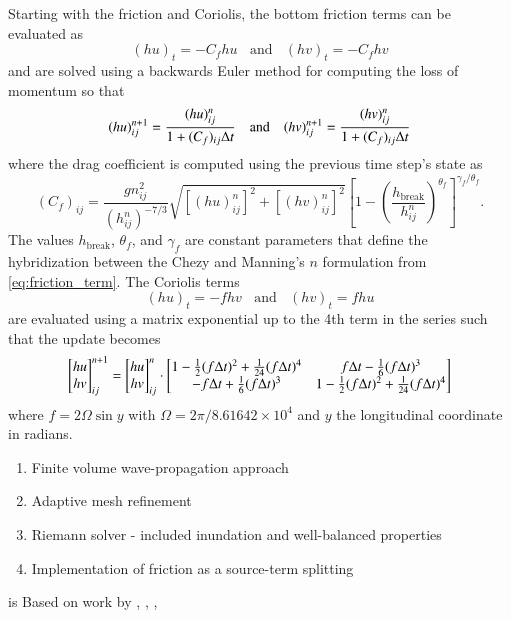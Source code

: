 Starting with the friction and Coriolis, the bottom friction terms can be evaluated as
\[
    (hu)_t = -C_f hu ~~~~\text{and}~~~~ (hv)_t = -C_f hv
\]
and are solved using a backwards Euler method for computing the loss of momentum so that
\[
    (hu)^{n+1}_{ij} = \frac{(hu)^n_{ij}}{1 + (C_f)_{ij} \Delta t} ~~~~\text{and}~~~~
    (hv)^{n+1}_{ij} = \frac{(hv)^n_{ij}}{1 + (C_f)_{ij} \Delta t}
\]
where the drag coefficient is computed using the previous time step's state as
\[
    (C_f)_{ij} = \frac{gn_{ij}^2}{(h^n_{ij})^{-7/3}} \sqrt{[(hu)^n_{ij}]^2 + [(hv)^n_{ij}]^2} \left[1-\left(\frac{h_{\text{break}}}{h^n_{ij}}\right)^{\theta_f} \right]^{\gamma_f / \theta_f}.
\]
The values $h_{\text{break}}$, $\theta_f$, and $\gamma_f$ are constant parameters that define the hybridization between the Chezy and Manning's $n$ formulation from \eqref{eq:friction_term}.  The Coriolis terms
\[
    (hu)_t = -f hv ~~~~\text{and}~~~~ (hv)_t = f hu
\]
are evaluated using a matrix exponential up to the 4th term in the series such that the update becomes
\[
    \begin{bmatrix}
        hu \\ hv     
    \end{bmatrix}^{n+1}_{ij} = 
    \begin{bmatrix}
        hu \\ hv     
    \end{bmatrix}^{n}_{ij} \cdot 
    \begin{bmatrix}
        1 - \frac{1}{2} (f \Delta t)^2 + \frac{1}{24} (f \Delta t)^4 & f \Delta t - \frac{1}{6} (f \Delta t)^3 \\
        - f \Delta t + \frac{1}{6} (f \Delta t)^3 & 1 - \frac{1}{2} (f \Delta t)^2 + \frac{1}{24} (f \Delta t)^4
    \end{bmatrix}
\]
where $f = 2 \Omega \sin y$ with $\Omega = 2 \pi / 8.61642\times10^4$ and $y$ the longitudinal coordinate in radians. 


\begin{enumerate}
    \item Finite volume wave-propagation approach
    \item Adaptive mesh refinement
    \item Riemann solver - included inundation and well-balanced properties
    \item Implementation of friction as a source-term splitting
\end{enumerate}


\geoclaw is Based on work by \cite{MacInnes:2013cr}, \cite{Berger:2011du}, \cite{Berger:2011vi}, \cite{George:2008aa}

